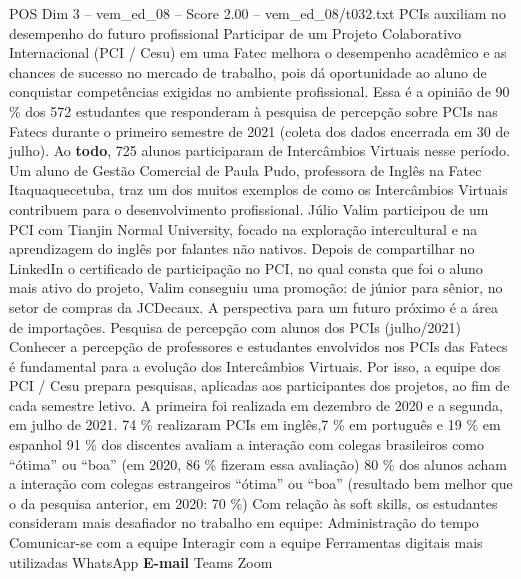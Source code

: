 \begin{textsample}{POS Dim 3 – vem\_ed\_08 – Score 2.00 – vem\_ed\_08/t032.txt}  \label{ex:f3_pos_011}
PCIs auxiliam no desempenho do futuro profissional Participar de um Projeto Colaborativo Internacional (PCI / Cesu) em uma Fatec melhora o desempenho acadêmico e as chances de sucesso no mercado de trabalho, pois dá oportunidade ao aluno de conquistar competências exigidas no ambiente profissional.
Essa é a opinião de 90 \% dos 572 estudantes que responderam à pesquisa de percepção sobre PCIs nas Fatecs durante o primeiro semestre de 2021 (coleta dos dados encerrada em 30 de julho).
Ao \textbf{todo}, 725 alunos participaram de Intercâmbios Virtuais nesse período.
Um aluno de Gestão Comercial de Paula Pudo, professora de Inglês na Fatec Itaquaquecetuba, traz um dos muitos exemplos de como os Intercâmbios Virtuais contribuem para o desenvolvimento profissional.
Júlio Valim participou de um PCI com Tianjin Normal University, focado na exploração intercultural e na aprendizagem do inglês por falantes não nativos.
Depois de compartilhar no LinkedIn o certificado de participação no PCI, no qual consta que foi o aluno mais ativo do projeto, Valim conseguiu uma promoção: de júnior para sênior, no setor de compras da JCDecaux.
A perspectiva para um futuro próximo é a área de importações.
Pesquisa de percepção com alunos dos PCIs (julho/2021) Conhecer a percepção de professores e estudantes envolvidos nos PCIs das Fatecs é fundamental para a evolução dos Intercâmbios Virtuais.
Por isso, a equipe dos PCI / Cesu prepara pesquisas, aplicadas aos participantes dos projetos, ao fim de cada semestre letivo.
A primeira foi realizada em dezembro de 2020 e a segunda, em julho de 2021. 74 \% realizaram PCIs em inglês,7 \% em português e 19 \% em espanhol 91 \% dos discentes avaliam a interação com colegas brasileiros como “ótima” ou “boa” (em 2020, 86 \% fizeram essa avaliação) 80 \% dos alunos acham a interação com colegas estrangeiros “ótima” ou “boa” (resultado bem melhor que o da pesquisa anterior, em 2020: 70 \%) Com relação às soft skills, os estudantes consideram mais desafiador no trabalho em equipe: Administração do tempo Comunicar-se com a equipe Interagir com a equipe Ferramentas digitais mais utilizadas WhatsApp \textbf{E-mail} Teams Zoom

\end{textsample}
